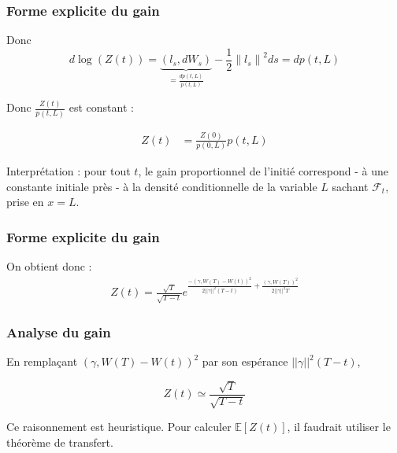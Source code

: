 \documentclass{beamer}
\begin{document}
\begin{frame}
\frametitle{Forme explicite du gain}
\par Donc
\begin{displaymath}
d \log \left( Z \left( t \right) \right) = \underbrace{\left(l_s, d W_s \right)}_{ = \frac{d p \left( t, L \right)}{p \left( t, L \right)}} - \frac{1}{2} {\| l_{s} \|}^{2} ds = d p \left( t, L \right)
\end{displaymath}

\par Donc $\frac{Z \left( t \right)}{ p \left( t, L \right) }$ est constant :

\begin{displaymath}
	\begin{split}
	Z \left( t \right) &= \frac{Z \left( 0 \right)}{ p \left( 0, L \right) } p \left( t, L \right)
	\end{split}
\end{displaymath}
\par Interprétation : pour tout $t$, le gain proportionnel de l'initié correspond - à une constante initiale près -  à la densité conditionnelle de la variable $L$ sachant $\mathcal{F}_t$, prise en $x = L$.
\end{frame}
 
\begin{frame}
\frametitle{Forme explicite du gain}
\par On obtient donc :
\begin{displaymath}
	\begin{split}
		\boxed{
	Z \left( t \right) = \frac{\sqrt{T}}{\sqrt{T - t}} e^{\frac{- \left( \gamma, W \left( T \right) - W \left( t \right) \right)^2}{2 ||\gamma||^2 \left( T - t \right)} + \frac{\left( \gamma, W \left( T \right) \right)^2}{2 ||\gamma||^2 T }}
		}
	\end{split}
\end{displaymath}
\end{frame}

\begin{frame}
\frametitle{Analyse du gain}
\par En remplaçant $ \left( \gamma, W \left( T \right) - W \left( t \right) \right)^2 $ par son espérance $||\gamma||^2 \left( T - t \right)  $,

\begin{displaymath}
	Z \left( t \right) \simeq \frac{\sqrt{T}}{\sqrt{T - t}}
\end{displaymath}

\par \textdbend Ce raisonnement est heuristique. Pour calculer $\mathbb{E} \left[ Z \left( t \right) \right]$, il faudrait utiliser le théorème de transfert.

\end{frame}
\end{document}
